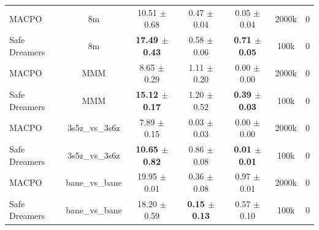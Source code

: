\documentclass{article}
\begin{document}
\begin{longtable}{lcccccc}
\midrule
MACPO & 8m & 10.51 $\pm$ 0.68 & 0.47 $\pm$ 0.04 & 0.05 $\pm$ 0.04 & 2000k & 0 \\
Safe Dreamers & 8m & \textbf{17.49 $\pm$ 0.43} & 0.58 $\pm$ 0.06 & \textbf{0.71 $\pm$ 0.05} & 100k & 0 \\
\midrule
MACPO & MMM & 8.65 $\pm$ 0.29 & 1.11 $\pm$ 0.20 & 0.00 $\pm$ 0.00 & 2000k & 0 \\
Safe Dreamers & MMM & \textbf{15.12 $\pm$ 0.17} & 1.20 $\pm$ 0.52 & \textbf{0.39 $\pm$ 0.03} & 100k & 0 \\
\midrule
MACPO & 3s5z\_vs\_3s6z & 7.89 $\pm$ 0.15 & 0.03 $\pm$ 0.03 & 0.00 $\pm$ 0.00 & 2000k & 0 \\
Safe Dreamers & 3s5z\_vs\_3s6z & \textbf{10.65 $\pm$ 0.82} & 0.86 $\pm$ 0.08 & \textbf{0.01 $\pm$ 0.01} & 100k & 0 \\
\midrule
MACPO & bane\_vs\_bane & 19.95 $\pm$ 0.01 & 0.36 $\pm$ 0.08 & 0.97 $\pm$ 0.01 & 2000k & 0 \\
Safe Dreamers & bane\_vs\_bane & 18.20 $\pm$ 0.59 & \textbf{0.15 $\pm$ 0.13} & 0.57 $\pm$ 0.10 & 100k & 0 \\
\end{longtable}
\end{document}
